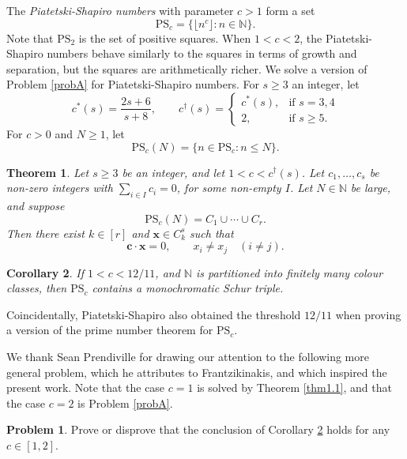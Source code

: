 \documentclass[12pt, reqno]{amsart}
\newtheorem{thm}{Theorem}[section]
\newtheorem{cor}[thm]{Corollary}
\theoremstyle{definition}
\theoremstyle{remark}
\numberwithin{equation}{section}
\theoremstyle{definition}
\newtheorem{prob}{Problem}
\def\le{\leqslant} \def\ge{\geqslant} \def\pleq{\preccurlyeq} \def\ple{\prec}
\def \bN {\mathbb N}
\def \bc {\mathbf c}
\def \bx {\mathbf x}
\def \PS {\mathrm{PS}}
\begin{document}
The \emph{Piatetski-Shapiro numbers} with parameter $c > 1$ form a set
\[
\PS_c = \{ \lfloor n^c \rfloor: n \in \bN \}.
\]
Note that $\PS_2$ is the set of positive squares. When $1 < c < 2$, the Piatetski-Shapiro numbers behave similarly to the squares in terms of growth and separation, but the squares are arithmetically richer. We solve a version of Problem \ref{probA} for Piatetski-Shapiro numbers. For $s \ge 3$ an integer, let
\begin{equation}
\label{eqn1.1}
c^*(s) = 
\frac{2s + 6}{s + 8}, \qquad
c^\dag(s) = \begin{cases}
c^*(s), &\text{if } s = 3, 4 \\
2, &\text{if } s \ge 5.
\end{cases}
\end{equation}
For $c > 0$ and $N \ge 1$, let
\[
\PS_c(N) = \{ n \in \PS_c: n \le N \}.
\]

\begin{thm} 
\label{thm1.4}
Let $s \ge 3$ be an integer, and let
$1 < c < c^\dag(s)$. Let $c_1, \ldots, c_s$ be non-zero integers with $\sum_{i \in I} c_i = 0$, for some non-empty
$I$. Let $N \in \bN$ be large, and suppose
\[
\PS_c(N) = C_1 \cup \cdots \cup C_r.
\]
Then there exist $k \in [r]$ and $\bx \in C_k^s$ such that
\begin{equation}
\label{eqn1.2}
\bc \cdot \bx = 0, \qquad
x_i \ne x_j \quad (i \ne j).
\end{equation}
\end{thm}

\begin{cor} \label{cor1.5}
If $1 < c < 12/11$, and $\bN$ is partitioned into finitely many colour classes, then $\PS_c$ contains a monochromatic Schur triple.
\end{cor}

\noindent Coincidentally, Piatetski-Shapiro \cite{PS1953} also obtained the threshold $12/11$ when proving a version of the prime number theorem for $\PS_c$. 

We thank Sean Prendiville for drawing our attention to the following more general problem, which he attributes to Frantzikinakis, and which inspired the present work. Note that the case $c = 1$ is solved by Theorem \ref{thm1.1}, and that the case $c = 2$ is Problem \ref{probA}.

\begin{prob} 
\label{probB}
Prove or disprove that the conclusion of Corollary \ref{cor1.5} holds for any $c \in [1, 2]$.
\end{prob}
\end{document}
